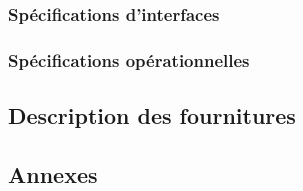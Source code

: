 \documentclass[asi]{picInsa}
\begin{document}
\section{Spécifications d'interfaces}
\label{specifications_interfaces}


\section{Spécifications opérationnelles}
\label{specifications_operationnelles}


\chapter{Description des fournitures}
\label{description_des_fournitures}


\begin{appendix}
\part*{Annexes}

\listoffigures
{}
	 
\listoftables
{}
\end{appendix}
\pageQuatriemeCouverture
\end{document}
